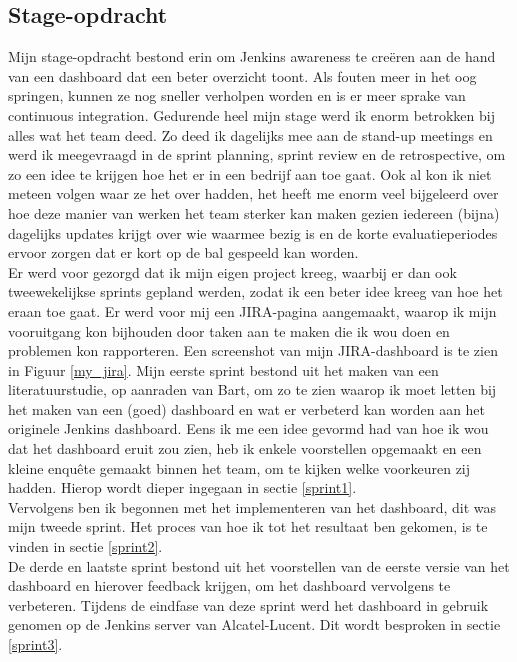 \documentclass[10pt,a4paper]{article}
\begin{document}
\subsection{Stage-opdracht}
\label{opdracht}
Mijn stage-opdracht bestond erin om Jenkins awareness te cre\"eren aan de hand van een dashboard dat een beter overzicht toont.
Als fouten meer in het oog springen, kunnen ze nog sneller verholpen worden en is er meer sprake van continuous integration.  Gedurende heel mijn stage werd ik enorm betrokken bij alles wat het team deed. Zo deed ik dagelijks mee aan de stand-up meetings en werd ik meegevraagd in de sprint planning, sprint review en de retrospective, om zo een idee te krijgen hoe het er in een bedrijf aan toe gaat. Ook al kon ik niet meteen volgen waar ze het over hadden, het heeft me enorm veel bijgeleerd over hoe deze manier van werken het team sterker kan maken gezien iedereen (bijna) dagelijks updates krijgt over wie waarmee bezig is en de korte evaluatieperiodes ervoor zorgen dat er kort op de bal gespeeld kan worden.\\
Er werd voor gezorgd dat ik mijn eigen project kreeg, waarbij er dan ook tweewekelijkse sprints gepland werden, zodat ik een beter idee kreeg van hoe het eraan toe gaat. Er werd voor mij een JIRA-pagina aangemaakt, waarop ik mijn vooruitgang kon bijhouden door taken aan te maken die ik wou doen en problemen kon rapporteren. Een screenshot van mijn JIRA-dashboard is te zien in Figuur \ref{my_jira}.
Mijn eerste sprint bestond uit het maken van een literatuurstudie, op aanraden van Bart, om zo te zien waarop ik moet letten bij het maken van een (goed) dashboard en wat er verbeterd kan worden aan het originele Jenkins dashboard. Eens ik me een idee gevormd had van hoe ik wou dat het dashboard eruit zou zien, heb ik enkele voorstellen opgemaakt en een kleine enqu\^ete gemaakt binnen het team, om te kijken welke voorkeuren zij hadden. Hierop wordt dieper ingegaan in sectie \ref{sprint1}.\\
Vervolgens ben ik begonnen met het implementeren van het dashboard, dit was mijn tweede sprint. Het proces van hoe ik tot het resultaat ben gekomen, is te vinden in sectie \ref{sprint2}.\\
De derde en laatste sprint bestond uit het voorstellen van de eerste versie van het dashboard en hierover feedback krijgen, om het dashboard vervolgens te verbeteren. Tijdens de eindfase van deze sprint werd het dashboard in gebruik genomen op de Jenkins server van Alcatel-Lucent. Dit wordt besproken in sectie \ref{sprint3}.
\end{document}

